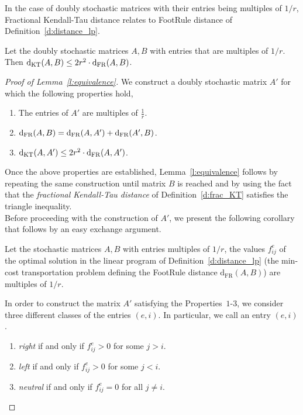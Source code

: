 \noindent In the case of doubly stochastic matrices with their entries being multiples of $1/r$, Fractional Kendall-Tau distance relates to FootRule distance of Definition~\ref{d:distance_lp}.
\begin{lemma}\label{l:equivalence}
    Let the doubly stochastic matrices $A,B$ with entries that are multiples of $1/r$. Then $\mathrm{d}_{\mathrm{KT}} ( A, B ) \leq 2r^2 \cdot  \mathrm{d}_{\mathrm{FR}}( A, B )$.
\end{lemma}

\begin{proof}[Proof of Lemma~\ref{l:equivalence}]
    We construct a doubly stochastic matrix $A'$ for which the following properties hold,
    \begin{enumerate}
        \item The entries of $A'$ are multiples of $\frac{1}{r}$.
        \item $\mathrm{d}_{\mathrm{FR}}(A,B) = \mathrm{d}_{\mathrm{FR}}(A, A') + \mathrm{d}_{\mathrm{FR}}(A',B)$.
        \item $\mathrm{d}_{\mathrm{KT}}( A, A' ) \leq 2r^2 \cdot  \mathrm{d}_{\mathrm{FR}}(A, A')$.
    \end{enumerate}
    
\noindent Once the above properties are established, Lemma~\ref{l:equivalence} follows by repeating the same construction until matrix $B$ is reached
and by using the fact that the \textit{fractional Kendall-Tau distance} of Definition~\ref{d:frac_KT}
satisfies the triangle inequality.\\

\noindent Before proceeding with the construction of $A'$, we present the following corollary that follows by an easy exchange argument.
\begin{corollary}\label{c:flow}
    Let the stochastic matrices $A,B$ with entries multiples of $1/r$, the values $f_{ij}^e$ of the optimal solution in the linear program of Definition~\ref{d:distance_lp} (the min-cost transportation problem defining the FootRule distance $\mathrm{d}_{\mathrm{FR}}(A,B)$) are multiples of $1/r$.
    \end{corollary}

\noindent In order to construct the matrix $A'$ satisfying the Properties~$1$-$3$, we consider three different classes of the entries $(e,i)$. In particular, we call an entry $(e,i)$.
    \begin{enumerate}
        \item \textit{right} if and only if $f_{ij}^e > 0$ for some $j > i$.
        \item \textit{left} if and only if $f_{ij}^e > 0 $ for some $j < i$.
        \item \textit{neutral} if and only if $f_{ij}^e = 0$ for all $j \neq i$.
    \end{enumerate}
    

\end{proof}
